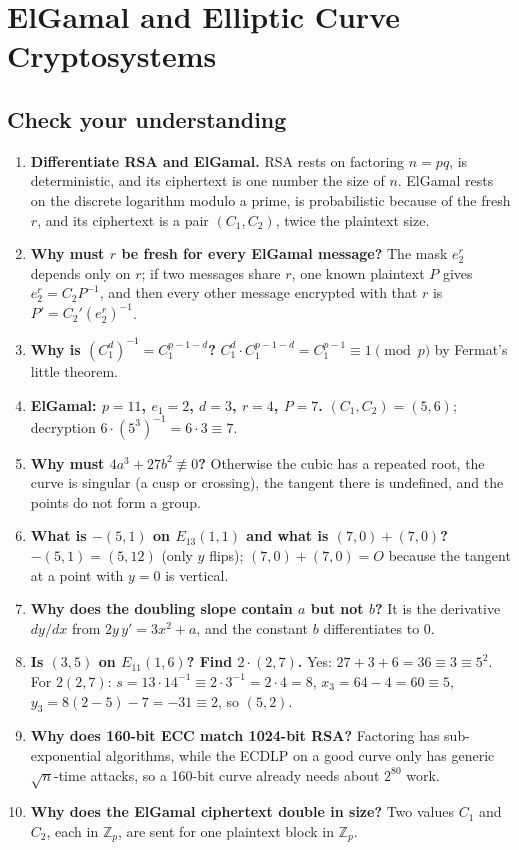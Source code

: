 \section{ElGamal and Elliptic Curve Cryptosystems \new}\label{q:18_elgamal_ecc}

\subsection*{Check your understanding}
\begin{enumerate}[leftmargin=1.6em]
  \item \textbf{Differentiate RSA and ElGamal.} RSA rests on factoring $n = pq$, is deterministic, and its ciphertext is one number the size of $n$. ElGamal rests on the discrete logarithm modulo a prime, is probabilistic because of the fresh $r$, and its ciphertext is a pair $(C_1, C_2)$, twice the plaintext size.
  \item \textbf{Why must $r$ be fresh for every ElGamal message?} The mask $e_2^r$ depends only on $r$; if two messages share $r$, one known plaintext $P$ gives $e_2^r = C_2 P^{-1}$, and then every other message encrypted with that $r$ is $P' = C_2' (e_2^r)^{-1}$.
  \item \textbf{Why is $(C_1^d)^{-1} = C_1^{p-1-d}$?} $C_1^d \cdot C_1^{p-1-d} = C_1^{p-1} \equiv 1 \pmod p$ by Fermat's little theorem.
  \item \textbf{ElGamal: $p = 11$, $e_1 = 2$, $d = 3$, $r = 4$, $P = 7$.} $(C_1, C_2) = (5, 6)$; decryption $6 \cdot (5^3)^{-1} = 6 \cdot 3 \equiv 7$.
  \item \textbf{Why must $4a^3 + 27b^2 \not\equiv 0$?} Otherwise the cubic has a repeated root, the curve is singular (a cusp or crossing), the tangent there is undefined, and the points do not form a group.
  \item \textbf{What is $-(5, 1)$ on $E_{13}(1, 1)$ and what is $(7, 0) + (7, 0)$?} $-(5, 1) = (5, 12)$ (only $y$ flips); $(7, 0) + (7, 0) = O$ because the tangent at a point with $y = 0$ is vertical.
  \item \textbf{Why does the doubling slope contain $a$ but not $b$?} It is the derivative $dy/dx$ from $2y\,y' = 3x^2 + a$, and the constant $b$ differentiates to 0.
  \item \textbf{Is $(3, 5)$ on $E_{11}(1, 6)$? Find $2 \cdot (2, 7)$.} Yes: $27 + 3 + 6 = 36 \equiv 3 \equiv 5^2$. For $2(2, 7)$: $s = 13 \cdot 14^{-1} \equiv 2 \cdot 3^{-1} = 2 \cdot 4 = 8$, $x_3 = 64 - 4 = 60 \equiv 5$, $y_3 = 8(2 - 5) - 7 = -31 \equiv 2$, so $(5, 2)$.
  \item \textbf{Why does 160-bit ECC match 1024-bit RSA?} Factoring has sub-exponential algorithms, while the ECDLP on a good curve only has generic $\sqrt{n}$-time attacks, so a 160-bit curve already needs about $2^{80}$ work.
  \item \textbf{Why does the ElGamal ciphertext double in size?} Two values $C_1$ and $C_2$, each in $\mathbb{Z}_p$, are sent for one plaintext block in $\mathbb{Z}_p$.
\end{enumerate}
